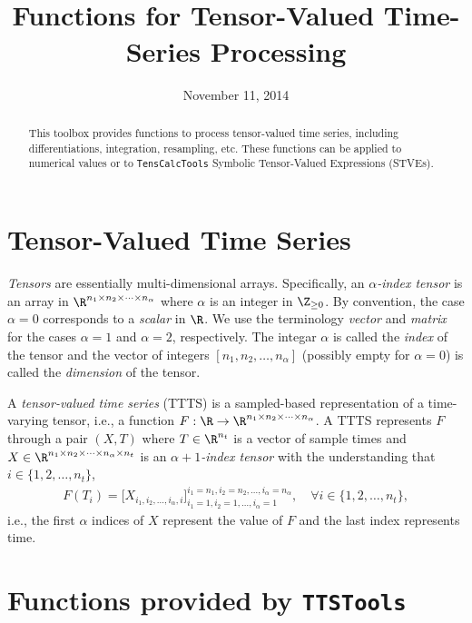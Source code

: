 \documentclass[11pt]{article}
\title{\sc \TTS \\[1em]\Large \matlab{} Functions for Tensor-Valued Time-Series Processing}
\author{\jph}
\date{November 11, 2014}
\newcommand{\TC}{\texttt{TensCalcTools}}
\newcommand{\TTS}{\texttt{TTSTools}}
\begin{document}
                        \maketitle

\begin{abstract}
  This toolbox provides functions to process tensor-valued time
  series, including differentiations, integration, resampling,
  etc. These functions can be applied to numerical values or to \TC{}
  Symbolic Tensor-Valued Expressions (STVEs).
\end{abstract}

\tableofcontents


\section{Tensor-Valued Time Series}

\emph{Tensors} are essentially multi-dimensional arrays. Specifically,
an \emph{$\alpha$-index tensor} is an array in $\R^{n_1\times n_2\times\cdots\times n_\alpha}$ where
$\alpha$ is an integer in $\Z_{\ge 0}$. By convention, the case $\alpha=0$
corresponds to a \emph{scalar} in $\R$. We use the terminology
\emph{vector} and \emph{matrix} for the cases $\alpha=1$ and $\alpha=2$,
respectively. The integar $\alpha$ is called the \emph{index} of the tensor
and the vector of integers $[n_1,n_2,\dots,n_\alpha]$ (possibly empty for
$\alpha=0$) is called the \emph{dimension} of the tensor.

\medskip

A \emph{tensor-valued time series} (TTTS) is a sampled-based
representation of a time-varying tensor, i.e., a function $F:\R\to \R^{n_1\times
  n_2\times\cdots\times n_\alpha}$. A TTTS represents $F$ through a pair $(X,T)$ where
$T\in\R^{n_t}$ is a vector of sample times
and $X\in\R^{n_1\times n_2\times\cdots\times
  n_\alpha\times n_t}$ is an \emph{$\alpha+1$-index tensor} with the understanding that
$i\in\{1,2,\dots,n_t\}$,
\begin{align*}
  F(T_i)=\big[ X_{i_1,i_2,\dots,i_\alpha,i}\big]_{i_1=1,i_2=1,\dots,i_\alpha=1}^{i_1=n_1,i_2=n_2,\dots,i_\alpha=n_\alpha},
  \quad\forall i\in\{1,2,\dots,n_t\},
\end{align*}
i.e., the first $\alpha$ indices of $X$ represent the value of $F$ and the
last index represents time.

\newpage

\section{Functions provided by \TTS}
\end{document}
